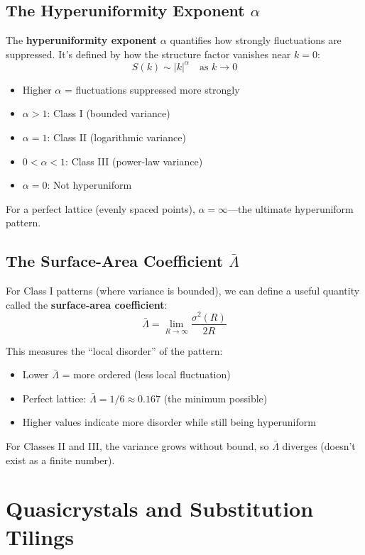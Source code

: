 \documentclass[11pt,letterpaper]{article}
\begin{document}
\subsection{The Hyperuniformity Exponent $\alpha$}

The \textbf{hyperuniformity exponent} $\alpha$ quantifies how strongly fluctuations are suppressed. It's defined by how the structure factor vanishes near $k = 0$:
\[
S(k) \sim |k|^\alpha \quad \text{as } k \to 0
\]

\begin{itemize}
    \item Higher $\alpha$ = fluctuations suppressed more strongly
    \item $\alpha > 1$: Class I (bounded variance)
    \item $\alpha = 1$: Class II (logarithmic variance)
    \item $0 < \alpha < 1$: Class III (power-law variance)
    \item $\alpha = 0$: Not hyperuniform
\end{itemize}

For a perfect lattice (evenly spaced points), $\alpha = \infty$---the ultimate hyperuniform pattern.

\subsection{The Surface-Area Coefficient $\bar{\Lambda}$}

For Class I patterns (where variance is bounded), we can define a useful quantity called the \textbf{surface-area coefficient}:
\[
\bar{\Lambda} = \lim_{R \to \infty} \frac{\sigma^2(R)}{2R}
\]

This measures the ``local disorder'' of the pattern:
\begin{itemize}
    \item Lower $\bar{\Lambda}$ = more ordered (less local fluctuation)
    \item Perfect lattice: $\bar{\Lambda} = 1/6 \approx 0.167$ (the minimum possible)
    \item Higher values indicate more disorder while still being hyperuniform
\end{itemize}

For Classes II and III, the variance grows without bound, so $\bar{\Lambda}$ diverges (doesn't exist as a finite number).

\section{Quasicrystals and Substitution Tilings}
\end{document}
